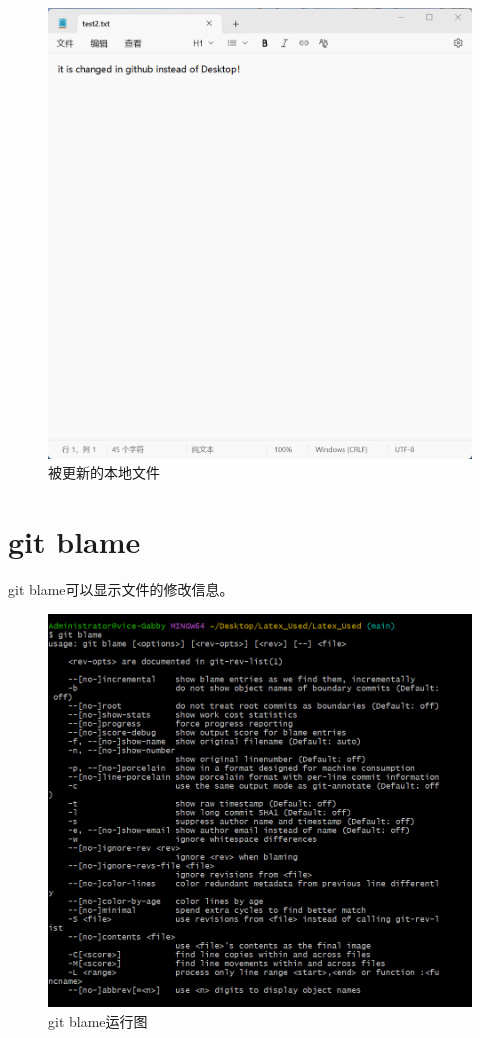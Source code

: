 \documentclass{article}
\begin{document}
\begin{figure}[H]
    \centering
    \includegraphics[width=1\linewidth]{本地文件.png}
    \caption{被更新的本地文件}
    \label{fig:pull2}
\end{figure}

\section{git blame}
git blame可以显示文件的修改信息。
\begin{figure}[H]
    \centering
    \includegraphics[width=1\linewidth]{git_blame.png}
    \caption{git blame运行图}
    \label{fig:blame}
\end{figure}
\end{document}
